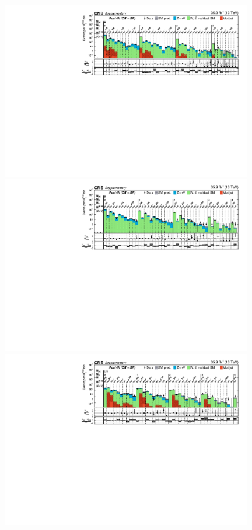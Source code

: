 \begin{figure}
    \begin{center}
            \includegraphics[width=0.98\textwidth]{Supplementary/FullBinning_results_4jet_full-fit-bg_aux}
            \includegraphics[width=0.98\textwidth]{Supplementary/FullBinning_results_5jet_full-fit-bg_aux}\\
            \includegraphics[width=0.98\textwidth]{Supplementary/FullBinning_results_6+_jets_full-fit-bg_aux}\\

\end{center}
\end{figure}
